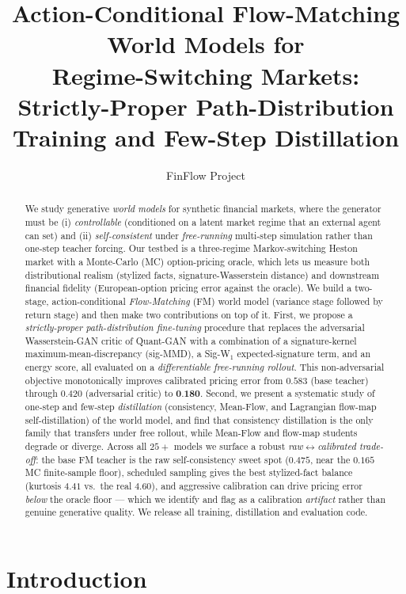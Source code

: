 \documentclass[11pt]{article}
\title{\bfseries Action-Conditional Flow-Matching World Models for\\
Regime-Switching Markets: Strictly-Proper Path-Distribution\\
Training and Few-Step Distillation}
\author{FinFlow Project}
\affil{Course: Principles and Methods of Deep-Learning-based Content Generation}
\date{}
\newcommand{\best}[1]{\textbf{#1}}
\begin{document}
\maketitle

\begin{abstract}
We study generative \emph{world models} for synthetic financial markets, where the
generator must be (i) \emph{controllable} (conditioned on a latent market regime
that an external agent can set) and (ii) \emph{self-consistent} under
\emph{free-running} multi-step simulation rather than one-step teacher forcing.
Our testbed is a three-regime Markov-switching Heston market with a Monte-Carlo
(MC) option-pricing oracle, which lets us measure both distributional realism
(stylized facts, signature-Wasserstein distance) and downstream financial
fidelity (European-option pricing error against the oracle). We build a two-stage,
action-conditional \emph{Flow-Matching} (FM) world model (variance stage followed
by return stage) and then make two contributions on top of it. First, we propose
a \emph{strictly-proper path-distribution fine-tuning} procedure that replaces the
adversarial Wasserstein-GAN critic of Quant-GAN with a combination of a
signature-kernel maximum-mean-discrepancy (sig-MMD), a Sig-W$_1$ expected-signature
term, and an energy score, all evaluated on a \emph{differentiable free-running
rollout}. This non-adversarial objective monotonically improves calibrated pricing
error from $0.583$ (base teacher) through $0.420$ (adversarial critic) to
$\best{0.180}$. Second, we present a systematic study of one-step and few-step
\emph{distillation} (consistency, Mean-Flow, and Lagrangian flow-map
self-distillation) of the world model, and find that consistency distillation is
the only family that transfers under free rollout, while Mean-Flow and flow-map
students degrade or diverge. Across all $25{+}$ models we surface a robust
\emph{raw$\leftrightarrow$calibrated trade-off}: the base FM teacher is the raw
self-consistency sweet spot ($0.475$, near the $0.165$ MC finite-sample floor),
scheduled sampling gives the best stylized-fact balance (kurtosis $4.41$ vs.\ the
real $4.60$), and aggressive calibration can drive pricing error \emph{below} the
oracle floor --- which we identify and flag as a calibration \emph{artifact}
rather than genuine generative quality. We release all training, distillation and
evaluation code.
\end{abstract}

\section{Introduction}
\label{sec:intro}
\end{document}
